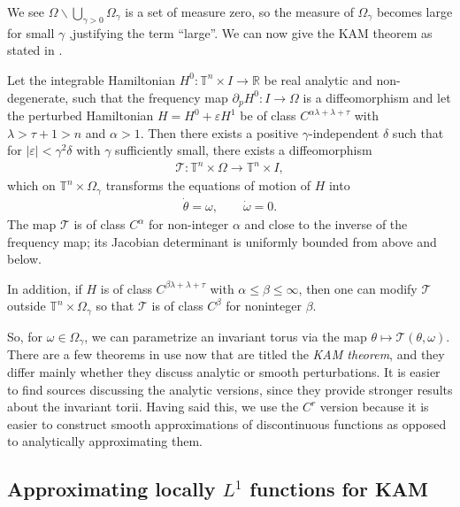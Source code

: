 We see $\Omega\backslash \bigcup_{\gamma>0}\Omega_\gamma$ is a set of measure zero, so the measure of $\Omega_\gamma$ becomes large for small $\gamma$ ,justifying the term ``large''. We can now give the KAM theorem as stated in \cite{poschel82}.

\begin{theorem}\label{thm:KAM}
Let the integrable Hamiltonian $H^0:\mathbb T^n\times I\to\mathbb R$ be real analytic and non-degenerate, such that the frequency map $\partial_p H^0:I\to\Omega$ is a diffeomorphism and let the perturbed Hamiltonian $H=H^0+\varepsilon H^1$ be of class $C^{\alpha\lambda+\lambda+\tau}$ with $\lambda>\tau+1>n$ and $\alpha>1$. Then there exists a positive $\gamma$-independent $\delta$ such that for $|\varepsilon|<\gamma^2\delta$ with $\gamma$ sufficiently small, there exists a diffeomorphism
\begin{align*}
\mathcal T: \mathbb T^n\times\Omega \to\mathbb T^n\times I,
\end{align*} 
which on $\mathbb T^n\times\Omega_\gamma$ transforms the equations of motion of $H$ into
\begin{align*}
\dot \theta=\omega,\qquad \dot\omega=0.
\end{align*}
The map $\mathcal T$ is of class $C^\alpha$ for non-integer $\alpha$ and close to the inverse of the frequency map; its Jacobian determinant is uniformly bounded from above and below.

In addition, if $H$ is of class $C^{\beta\lambda+\lambda+\tau}$ with $\alpha\le\beta\le\infty$, then one can modify $\mathcal T$ outside $\mathbb T^n\times\Omega_\gamma$ so that $\mathcal T$ is of class $C^\beta$ for noninteger $\beta$.
\end{theorem}

So, for $\omega\in\Omega_\gamma$, we can parametrize an invariant torus via the map $\theta\mapsto\mathcal T(\theta,\omega)$. There are a few theorems in use now that are titled the \textit{KAM theorem}, and they differ mainly whether they discuss analytic or smooth perturbations. It is easier to find sources discussing the analytic versions, since they provide stronger results about the invariant torii. Having said this, we use the $C^r$ version because it is easier to construct smooth approximations of discontinuous functions as opposed to analytically approximating them.

\subsection{Approximating locally $L^1$ functions for KAM}

